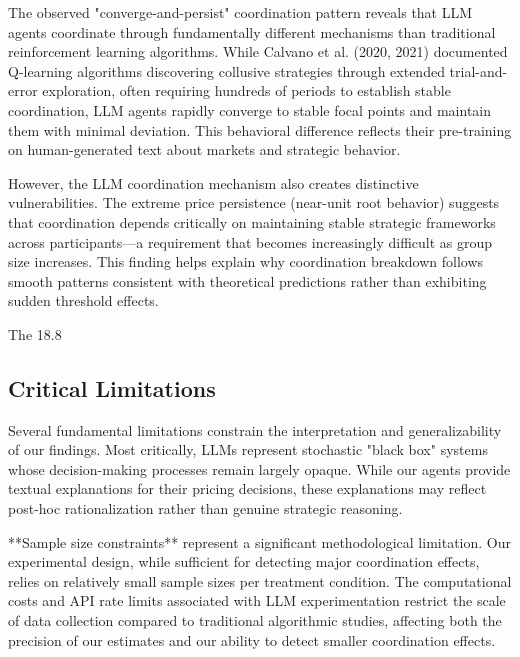 The observed "converge-and-persist" coordination pattern reveals that LLM agents coordinate through fundamentally different mechanisms than traditional reinforcement learning algorithms. While Calvano et al. (2020, 2021) documented Q-learning algorithms discovering collusive strategies through extended trial-and-error exploration, often requiring hundreds of periods to establish stable coordination, LLM agents rapidly converge to stable focal points and maintain them with minimal deviation. This behavioral difference reflects their pre-training on human-generated text about markets and strategic behavior.

However, the LLM coordination mechanism also creates distinctive vulnerabilities. The extreme price persistence (near-unit root behavior) suggests that coordination depends critically on maintaining stable strategic frameworks across participants—a requirement that becomes increasingly difficult as group size increases. This finding helps explain why coordination breakdown follows smooth patterns consistent with theoretical predictions rather than exhibiting sudden threshold effects.

The 18.8%

\subsection{Critical Limitations}

Several fundamental limitations constrain the interpretation and generalizability of our findings. Most critically, LLMs represent stochastic "black box" systems whose decision-making processes remain largely opaque. While our agents provide textual explanations for their pricing decisions, these explanations may reflect post-hoc rationalization rather than genuine strategic reasoning.

**Sample size constraints** represent a significant methodological limitation. Our experimental design, while sufficient for detecting major coordination effects, relies on relatively small sample sizes per treatment condition. The computational costs and API rate limits associated with LLM experimentation restrict the scale of data collection compared to traditional algorithmic studies, affecting both the precision of our estimates and our ability to detect smaller coordination effects.

